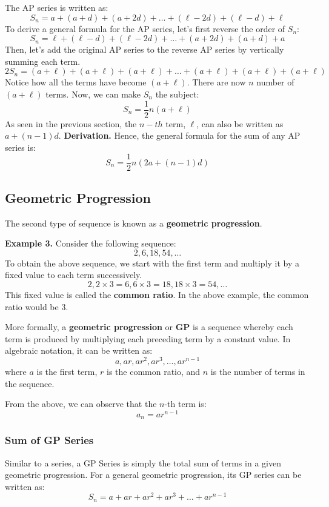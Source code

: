 \documentclass[12pt]{article}
\begin{document}
The AP series is written as:
\[
	S_n = a + (a + d) + (a + 2d) + \dots + (\ell - 2d) + (\ell - d) + \ell
\]
To derive a general formula for the AP series, let's first reverse the order of $S_n$:
\[
	S_n = \ell + (\ell - d) + (\ell - 2d) + \dots + (a + 2d) + (a + d) + a
\]
Then, let's add the original AP series to the reverse AP series by vertically summing each term.
\[
	2S_n = (a + \ell) + (a + \ell) + (a + \ell) + \dots + (a + \ell) + (a + \ell) + (a + \ell)
\]
Notice how all the terms have become $(a + \ell)$. There are now $n$ number of $(a + \ell)$ terms. Now, we can make $S_n$ the subject:
\[
	S_n = \frac{1}{2}n(a + \ell)
\]
As seen in the previous section, the $n-th$ term, $\ell$, can also be written as $a + (n - 1)d$.
\textbf{Derivation.} Hence, the general formula for the sum of any AP series is:
\[
	S_n = \frac{1}{2}n(2a + (n-1)d)
\]

\subsection{Geometric Progression}

The second type of sequence is known as a \textbf{geometric progression}.

\textbf{Example 3.} Consider the following sequence:
\[
	2, 6, 18, 54, \dots
\]
To obtain the above sequence, we start with the first term and multiply it by a fixed value to each term successively.
\[
	2, 2 \times 3 = 6, 6 \times 3 = 18, 18 \times 3 = 54, \dots
\]
This fixed value is called the \textbf{common ratio}. In the above example, the common ratio would be 3.

More formally, a \textbf{geometric progression} or \textbf{GP} is a sequence whereby each term is produced by multiplying each preceding term by a constant value. In algebraic notation, it can be written as:
\[
  a, ar, ar^2, ar^3, \dots, ar^{n-1}
\]
where $a$ is the first term, $r$ is the common ratio, and $n$ is the number of terms in the sequence.

From the above, we can observe that the $n$-th term is:
\[
  a_n = ar^{n-1}
\]

\subsubsection{Sum of GP Series}

Similar to a series, a GP Series is simply the total sum of terms in a given geometric progression. For a general geometric progression, its GP series can be written as:
\[
  S_n = a + ar + ar^2 + ar^3 + \dots + ar^{n-1}
\]
\end{document}
